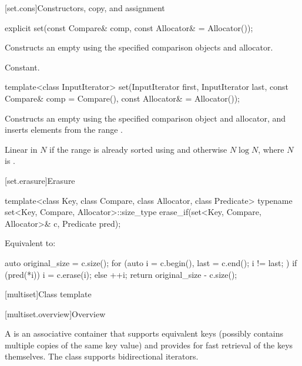 [set.cons]{Constructors, copy, and assignment}

%
\begin{itemdecl}
explicit set(const Compare& comp, const Allocator& = Allocator());
\end{itemdecl}

\begin{itemdescr}
\pnum
\effects
Constructs an empty  using the specified comparison objects and allocator.

\pnum
\complexity
Constant.
\end{itemdescr}

%
\begin{itemdecl}
template<class InputIterator>
  set(InputIterator first, InputIterator last,
      const Compare& comp = Compare(), const Allocator& = Allocator());
\end{itemdecl}

\begin{itemdescr}
\pnum
\effects
Constructs an empty
using the specified comparison object and allocator,
and inserts elements from the range
.

\pnum
\complexity
Linear in $N$ if the range
is already sorted using 
and otherwise $N \log N$,
where $N$ is
.
\end{itemdescr}

[set.erasure]{Erasure}

%
\begin{itemdecl}
template<class Key, class Compare, class Allocator, class Predicate>
  typename set<Key, Compare, Allocator>::size_type
    erase_if(set<Key, Compare, Allocator>& c, Predicate pred);
\end{itemdecl}

\begin{itemdescr}
\pnum
\effects
Equivalent to:
\begin{codeblock}
auto original_size = c.size();
for (auto i = c.begin(), last = c.end(); i != last; ) {
  if (pred(*i)) {
    i = c.erase(i);
  } else {
    ++i;
  }
}
return original_size - c.size();
\end{codeblock}
\end{itemdescr}

[multiset]{Class template }

[multiset.overview]{Overview}

\pnum
{}%
A
is an associative container that supports equivalent keys (possibly contains multiple copies of
the same key value) and provides for fast retrieval of the keys themselves.
The
 class
supports bidirectional iterators.

